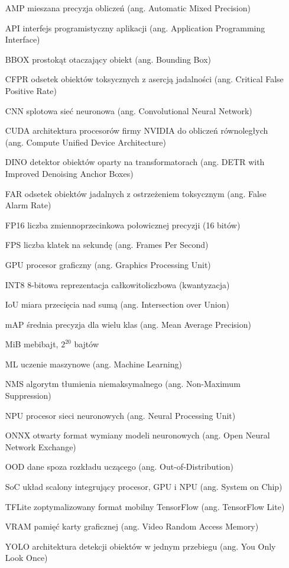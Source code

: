 \flushleft

\begin{itemize}[noitemsep,topsep=0pt,parsep=0pt,partopsep=0pt,labelwidth=3cm,align=left,leftmargin=4cm]
    \item[AMP] mieszana precyzja obliczeń (ang. Automatic Mixed Precision)
    \item[API] interfejs programistyczny aplikacji (ang. Application Programming Interface)
    \item[BBOX] prostokąt otaczający obiekt (ang. Bounding Box)
    \item[CFPR] odsetek obiektów toksycznych z asercją jadalności (ang. Critical False Positive Rate)
    \item[CNN] splotowa sieć neuronowa (ang. Convolutional Neural Network)
    \item[CUDA] architektura procesorów firmy NVIDIA do obliczeń równoległych (ang. Compute Unified Device Architecture)
    \item[DINO] detektor obiektów oparty na transformatorach (ang. DETR with Improved Denoising Anchor Boxes)
    \item[FAR] odsetek obiektów jadalnych z ostrzeżeniem toksycznym (ang. False Alarm Rate)
    \item[FP16] liczba zmiennoprzecinkowa połowicznej precyzji (16 bitów)
    \item[FPS] liczba klatek na sekundę (ang. Frames Per Second)
    \item[GPU] procesor graficzny (ang. Graphics Processing Unit)
    \item[INT8] 8-bitowa reprezentacja całkowitoliczbowa (kwantyzacja)
    \item[IoU] miara przecięcia nad sumą (ang. Intersection over Union)
    \item[mAP] średnia precyzja dla wielu klas (ang. Mean Average Precision)
    \item[MiB] mebibajt, $2^{20}$ bajtów
    \item[ML] uczenie maszynowe (ang. Machine Learning)
    \item[NMS] algorytm tłumienia niemaksymalnego (ang. Non-Maximum Suppression)
    \item[NPU] procesor sieci neuronowych (ang. Neural Processing Unit)
    \item[ONNX] otwarty format wymiany modeli neuronowych (ang. Open Neural Network Exchange)
    \item[OOD] dane spoza rozkładu uczącego (ang. Out-of-Distribution)
    \item[SoC] układ scalony integrujący procesor, GPU i NPU (ang. System on Chip)
    \item[TFLite] zoptymalizowany format mobilny TensorFlow (ang. TensorFlow Lite)
    \item[VRAM] pamięć karty graficznej (ang. Video Random Access Memory)
    \item[YOLO] architektura detekcji obiektów w jednym przebiegu (ang. You Only Look Once)
\end{itemize}
